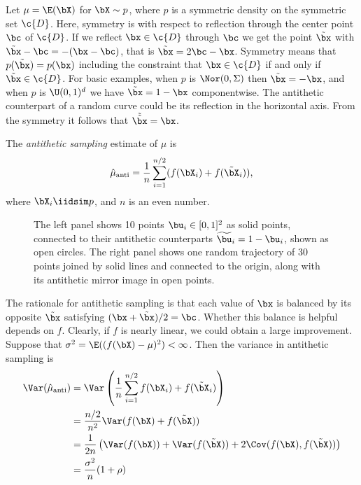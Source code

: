 Let $\mu = \E(\bX)$ for $\bX \sim p$, where $p$ is a symmetric density on the symmetric set $\c{D}$. Here, symmetry is with respect to reflection through the center point $\bc$ of $\c{D}$. If we reflect $\bx \in \c{D}$ through $\bc$ we get the point $\tilde{\bx}$ with $\tilde{\bx} - \bc = -(\bx - \bc)$, that is $\tilde{\bx} = 2\bc - \bx$. Symmetry means that $p(\tilde{\bx}) = p(\bx)$ including the constraint that $\bx \in \c{D}$ if and only if $\tilde{\bx} \in \c{D}$. For basic examples, when $p$ is $\Nor(0, \Sigma)$ then $\tilde{\bx} = -\bx$, and when $p$ is $\U(0, 1)^d$ we have $\tilde{\bx} = 1 - \bx$ componentwise. The antithetic counterpart of a random curve could be its reflection in the horizontal axis. From the symmetry it follows that $\tilde{\tilde{\bx}} = \bx$.

The \textit{antithetic sampling} estimate of $\mu$ is
\begin{equation} \label{eq:AntitheticSamplingEstimate}
	\hat{\mu}_{\mathrm{anti}} = \frac{1}{n} \sum_{i=1}^{n/2} (f(\bX_i) + f(\tilde{\bX}_i)),
\end{equation}
where $\bX_i \iidsim p$, and $n$ is an even number.

\begin{figure}[H]
	\centering
	
	\caption{The left panel shows 10 points $\bu_i \in [0, 1]^2$ as solid points, connected to their antithetic counterparts $\widetilde{\bu}_i = 1 - \bu_i$, shown as open circles. The right panel shows one random trajectory of 30 points joined by solid lines and connected to the origin, along with its antithetic mirror image in open points.}
	\label{fig:AntitheticVariates}
\end{figure}

The rationale for antithetic sampling is that each value of $\bx$ is balanced by its opposite $\tilde{\bx}$ satisfying $(\bx + \tilde{\bx})/2 = \bc$. Whether this balance is helpful depends on $f$. Clearly, if $f$ is nearly linear, we could obtain a large improvement. Suppose that $\sigma^2 = \E((f(\bX) - \mu)^2) < \infty$. Then the variance in antithetic sampling is
\begin{align}
	\Var(\hat{\mu}_{\mathrm{anti}}) & = \Var\left(\frac{1}{n} \sum_{i=1}^{n/2} f(\bX_i) + f(\tilde{\bX}_i)\right) \notag                     \\
	                                & = \frac{n/2}{n^2} \Var(f(\bX) + f(\tilde{\bX})) \notag                                                 \\
	                                & = \frac{1}{2n} \left(\Var(f(\bX)) + \Var(f(\tilde{\bX})) + 2\Cov(f(\bX), f(\tilde{\bX}))\right) \notag \\
	                                & = \frac{\sigma^2}{n} (1+\rho) \label{eq:AntiVar}
\end{align}


